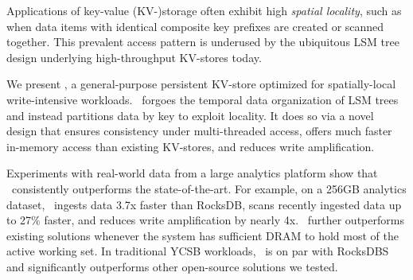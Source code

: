 Applications of key-value (KV-)storage often exhibit high \emph{spatial locality}, such as  
when data items with identical composite key prefixes are created or scanned together.  
This prevalent access pattern is underused by the ubiquitous LSM tree design underlying 
high-throughput KV-stores today.

We present \sys, a general-purpose persistent KV-store optimized for spatially-local write-intensive
workloads. 
\sys\ forgoes the temporal data organization of LSM trees and instead partitions data by key to exploit locality. 
It does so via a novel design that ensures consistency under multi-threaded access,   
offers much faster in-memory access than existing KV-stores, and 
reduces write amplification. 

Experiments with real-world data from a large analytics platform show that \sys\  
consistently outperforms the state-of-the-art. For example, on a 256GB analytics dataset, 
\sys\ ingests data 3.7x faster than RocksDB,  scans recently ingested data up to 27\% faster, 
and reduces write amplification by nearly 4x. 
\sys\ further outperforms existing solutions whenever 
the system has sufficient DRAM to hold most of the active working set. 
In traditional YCSB workloads, %
\sys\ is on par with RocksDBS and significantly outperforms other open-source solutions we tested.
